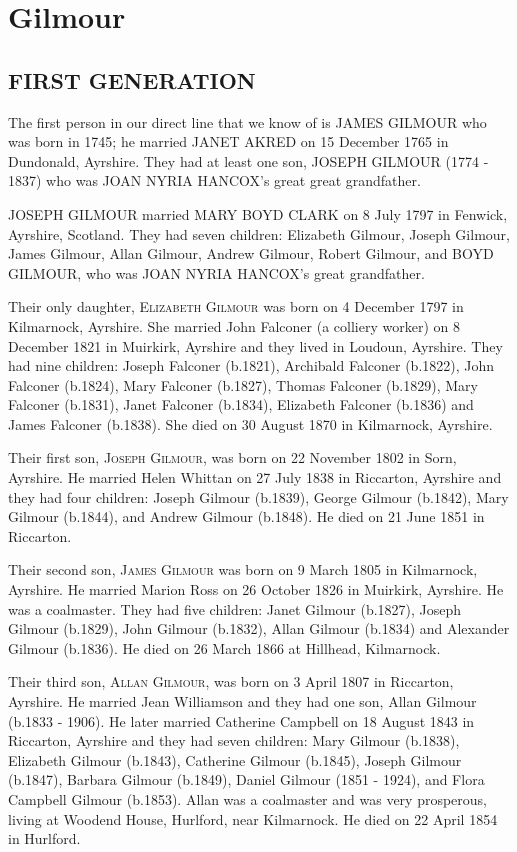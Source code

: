 \section{Gilmour}

\subsection{FIRST GENERATION}

The first person in our direct line that we know of is \uppercase{James Gilmour} who was born in 1745;  he married \uppercase{Janet Akred} on 15 December 1765 in Dundonald, Ayrshire. They had at least one son, \uppercase{Joseph Gilmour} (1774 - 1837) who was \uppercase{Joan Nyria Hancox}'s great great grandfather.

\uppercase{Joseph Gilmour} married \uppercase{Mary Boyd Clark} on 8 July 1797 in Fenwick, Ayrshire, Scotland. They had seven children: Elizabeth Gilmour, Joseph Gilmour, James Gilmour, Allan Gilmour, Andrew Gilmour, Robert Gilmour, and \uppercase{Boyd Gilmour}, who was \uppercase{Joan Nyria Hancox}'s great grandfather.

Their only daughter, \textsc{Elizabeth Gilmour} was born on 4 December 1797 in Kilmarnock, Ayrshire. She married John Falconer (a colliery worker) on 8 December 1821 in Muirkirk, Ayrshire and they lived in Loudoun, Ayrshire. They had nine children: Joseph Falconer (b.1821), Archibald Falconer (b.1822), John Falconer (b.1824), Mary Falconer (b.1827), Thomas Falconer (b.1829), Mary Falconer (b.1831), Janet Falconer (b.1834), Elizabeth Falconer (b.1836) and James Falconer (b.1838).  She died on 30 August 1870 in Kilmarnock, Ayrshire.

Their first son, \textsc{Joseph Gilmour}, was born on 22 November 1802 in Sorn,	Ayrshire.  He married Helen Whittan on 27 July 1838 in Riccarton, Ayrshire and they had four children: Joseph Gilmour (b.1839),  George Gilmour (b.1842), Mary Gilmour (b.1844), and Andrew Gilmour (b.1848). He died on	21 June 1851 in Riccarton.	

Their second son, \textsc{James Gilmour} was born on 9 March 1805 in Kilmarnock, Ayrshire. He married Marion Ross on 26 October 1826 in Muirkirk, Ayrshire. He was a coalmaster. They had five children: Janet Gilmour (b.1827), Joseph Gilmour (b.1829), John Gilmour (b.1832), Allan Gilmour (b.1834) and Alexander Gilmour (b.1836). He died on 26 March 1866 at Hillhead, Kilmarnock.

Their third son, \textsc{Allan Gilmour}, was born on 3 April 1807 in Riccarton, Ayrshire. He married Jean Williamson and they had one son, Allan Gilmour (b.1833 - 1906).  He later married Catherine Campbell on 18 August 1843 in Riccarton, Ayrshire and they had seven children: Mary Gilmour (b.1838), Elizabeth Gilmour (b.1843), Catherine Gilmour (b.1845), Joseph Gilmour (b.1847), Barbara Gilmour (b.1849), Daniel Gilmour (1851 - 1924), and Flora Campbell Gilmour (b.1853).  Allan was a coalmaster and was very prosperous, living at Woodend House, Hurlford, near Kilmarnock.  He died on 22 April 1854 in Hurlford.

